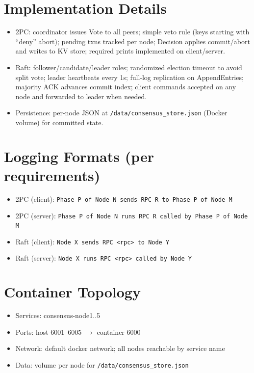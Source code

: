 \documentclass[11pt]{article}
\begin{document}
\section*{Implementation Details}
\begin{itemize}[leftmargin=*]
  \item 2PC: coordinator issues Vote to all peers; simple veto rule (keys starting with ``deny'' abort); pending txns tracked per node; Decision applies commit/abort and writes to KV store; required prints implemented on client/server.
  \item Raft: follower/candidate/leader roles; randomized election timeout to avoid split vote; leader heartbeats every 1s; full-log replication on AppendEntries; majority ACK advances commit index; client commands accepted on any node and forwarded to leader when needed.
  \item Persistence: per-node JSON at \texttt{/data/consensus\_store.json} (Docker volume) for committed state.
\end{itemize}

\section*{Logging Formats (per requirements)}
\begin{itemize}[leftmargin=*]
  \item 2PC (client): \texttt{Phase P of Node N sends RPC R to Phase P of Node M}
  \item 2PC (server): \texttt{Phase P of Node N runs RPC R called by Phase P of Node M}
  \item Raft (client): \texttt{Node X sends RPC <rpc> to Node Y}
  \item Raft (server): \texttt{Node X runs RPC <rpc> called by Node Y}
\end{itemize}

\section*{Container Topology}
\begin{itemize}[leftmargin=*]
  \item Services: consensus-node1..5
  \item Ports: host 6001--6005 $\rightarrow$ container 6000
  \item Network: default docker network; all nodes reachable by service name
  \item Data: volume per node for \texttt{/data/consensus\_store.json}
\end{itemize}
\end{document}
